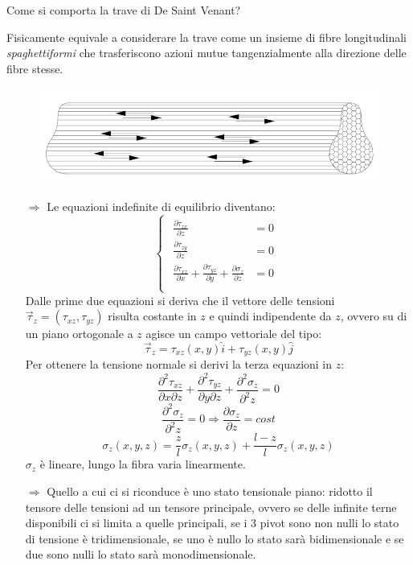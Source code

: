 	Come si comporta la trave di De Saint Venant?
	
	Fisicamente equivale a considerare la trave come un insieme di fibre longitudinali \textit{spaghettiformi} che trasferiscono
	azioni mutue tangenzialmente alla direzione delle fibre stesse.  
	\begin{figure}[H]
		\centering
		\includegraphics[width=0.5\linewidth]{Immagini_2/screenshot004}
		\label{fig:screenshot004}
	\end{figure}	
	
\begin{itemize}
	\item[$\Rightarrow$] Le equazioni indefinite di equilibrio diventano: 
	\[ \begin{cases}
		\begin{aligned}
			\frac{\partial \tau_{zx}}{\partial z} & =0 \\
			
			\frac{\partial \tau_{zy}}{\partial z} & =0 \\
			
			\frac{\partial \tau_{xz}}{\partial x} + \frac{\partial \tau_{yz}}{\partial y} + \frac{\partial\sigma_z}{\partial z} & =0 \\
		\end{aligned}
	\end{cases}\]
	Dalle prime due equazioni si deriva che il vettore delle tensioni $\vec{\tau}_z=(\tau_{xz},\tau_{yz})$ risulta costante in $ z $ e quindi indipendente da $ z $, ovvero su di un piano ortogonale a $z$ agisce un campo vettoriale del tipo:
	\[ \vec{\tau}_z=\tau_{xz}(x,y)\hat{i} + \tau_{yz}(x,y)\hat{j} \]
	Per ottenere la tensione normale si derivi la terza equazioni in $z$:
	\[\frac{\partial^2 \tau_{xz}}{\partial x\partial z} + \frac{\partial^2 \tau_{yz}}{\partial y\partial z} + \frac{\partial^2\sigma_z}{\partial^2 z}  = 0 \]
	\[ \frac{\partial^2\sigma_z}{\partial^2 z}  = 0 \Rightarrow \frac{\partial\sigma_z}{\partial z}  = cost \]
	\[ \sigma_z (x,y,z)= \dfrac{z}{l}\sigma_z (x,y,z) + \dfrac{l-z}{l}\sigma_z (x,y,z)\]
	$\sigma_z$ è lineare, lungo la fibra varia linearmente. \newline


	\item[$\Rightarrow$] Quello a cui ci si riconduce è uno stato tensionale piano: ridotto il tensore delle tensioni ad un tensore principale, ovvero se delle infinite terne disponibili ci si limita a quelle principali, se i 3 pivot sono non nulli lo stato di tensione è tridimensionale, se uno è nullo lo stato sarà bidimensionale e se due sono nulli lo stato sarà monodimensionale. \newline 


\end{itemize}
